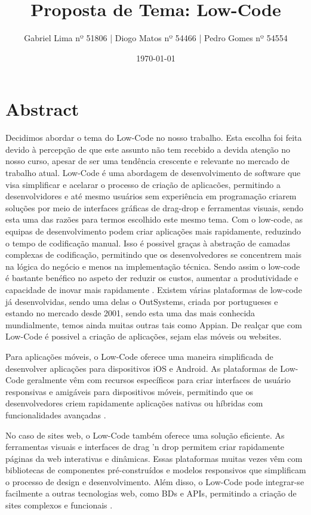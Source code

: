 \documentclass{article}
\title{Proposta de Tema: Low-Code}
\author{Gabriel Lima nº 51806 | Diogo Matos nº 54466 | Pedro Gomes nº 54554}
\date{\today}
\begin{document}
\maketitle

\section*{Abstract}

\newline Decidimos abordar o tema do Low-Code no nosso trabalho. Esta escolha foi feita devido à percepção de que este assunto não tem recebido a devida atenção no nosso curso, apesar de ser uma tendência crescente e relevante no mercado de trabalho atual. Low-Code é uma abordagem de desenvolvimento de software que visa simplificar e acelarar o processo de criação de aplicacões, permitindo a desenvolvidores e até mesmo usuários sem experiência em programação criarem soluções \cite{2,4,3} por meio de interfaces gráficas de drag-drop e ferramentas visuais, sendo esta uma das razões para termos escolhido este mesmo tema. Com o low-code, as equipas de desenvolvimento podem criar aplicações mais rapidamente, reduzindo o tempo de codificação manual. Isso é possivel graças à abstração de camadas complexas de codificação, permitindo que os desenvolvedores se concentrem mais na lógica do negócio e menos na implementação técnica. Sendo assim o low-code é bastante benéfico no aspeto der reduzir os custos, aumentar a produtividade e capacidade de inovar mais rapidamente \cite{4}. Existem várias plataformas de low-code já desenvolvidas, sendo uma delas o OutSystems, criada por portugueses e estando no mercado desde 2001, sendo esta uma das mais conhecida mundialmente, temos ainda muitas outras tais como Appian. De realçar que com Low-Code é possivel a criação de aplicações, sejam elas móveis ou websites.

\newline Para aplicações móveis, o Low-Code oferece uma maneira simplificada de desenvolver aplicações para dispositivos iOS e Android. As plataformas de Low-Code geralmente vêm com recursos específicos para criar interfaces de usuário responsivas e amigáveis para dispositivos móveis, permitindo que os desenvolvedores criem rapidamente aplicações nativas ou híbridas com funcionalidades avançadas \cite{6}.

\newline No caso de sites web, o Low-Code também oferece uma solução eficiente. As ferramentas visuais e interfaces de drag 'n drop permitem criar rapidamente páginas da web interativas e dinâmicas. Essas plataformas muitas vezes vêm com bibliotecas de componentes pré-construídos e modelos responsivos que simplificam o processo de design e desenvolvimento. Além disso, o Low-Code pode integrar-se facilmente a outras tecnologias web, como BDs e APIs, permitindo a criação de sites complexos e funcionais \cite{6}.
\end{document}
